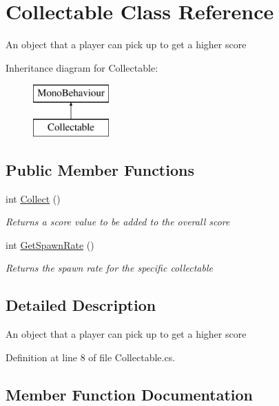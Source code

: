 \hypertarget{class_collectable}{}\section{Collectable Class Reference}
\label{class_collectable}


An object that a player can pick up to get a higher score  


Inheritance diagram for Collectable\+:\begin{figure}[H]
\begin{center}
\leavevmode
\includegraphics[height=2.000000cm]{class_collectable}
\end{center}
\end{figure}
\subsection*{Public Member Functions}
\begin{DoxyCompactItemize}
\item 
int \mbox{\hyperlink{class_collectable_a6ee23f6709322822b8334c014537e555}{Collect}} ()
\begin{DoxyCompactList}\small\item\em Returns a score value to be added to the overall score \end{DoxyCompactList}\item 
int \mbox{\hyperlink{class_collectable_a11287fc9a8dda57c70095d56f53aa329}{Get\+Spawn\+Rate}} ()
\begin{DoxyCompactList}\small\item\em Returns the spawn rate for the specific collectable \end{DoxyCompactList}\end{DoxyCompactItemize}


\subsection{Detailed Description}
An object that a player can pick up to get a higher score 



Definition at line 8 of file Collectable.\+cs.



\subsection{Member Function Documentation}
\mbox{\label{class_collectable_a6ee23f6709322822b8334c014537e555}} 
